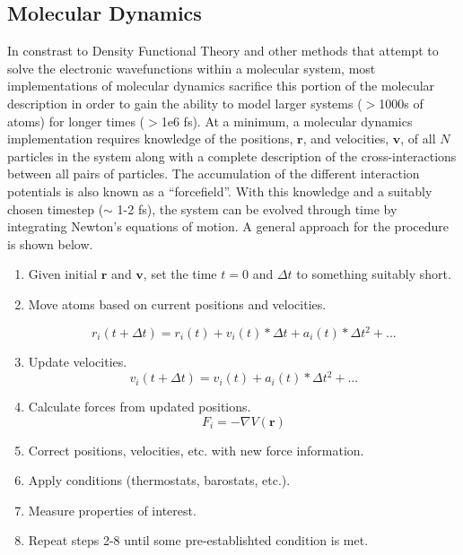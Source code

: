 \subsection{Molecular Dynamics}
In constrast to Density Functional Theory and other methods that attempt to
solve the electronic wavefunctions within a molecular system, most
implementations of molecular dynamics sacrifice this portion of the molecular
description in order to gain the ability to model larger systems ($>$1000s of
atoms) for longer times ($>$1e6 fs). At a minimum, a molecular dynamics
implementation requires knowledge of the positions, $\mathbf{r}$, and
velocities, $\mathbf{v}$, of all $N$ particles in the system along with a
complete description of the cross-interactions between all pairs of particles.
The accumulation of the different interaction potentials is also known as a
``forcefield''. With this knowledge and a suitably chosen timestep ($\sim$ 1-2
fs), the system can be evolved through time by integrating Newton's equations
of motion. A general approach for the procedure is shown below.

\begin{enumerate}
\item Given initial $\mathbf{r}$ and $\mathbf{v}$, set the time $t=0$ and
$\Delta t$ to something suitably short.

\item Move atoms based on current positions and velocities.

\begin{equation*}
r_i(t + \Delta t) = r_i(t) + v_i(t)*\Delta t + a_i(t)*\Delta t^2 + ...
\end{equation*}

\item Update velocities.
\begin{equation*}
v_i(t + \Delta t) = v_i(t) + a_i(t)*\Delta t^2 + ...
\end{equation*}

\item Calculate forces from updated positions.
\begin{equation*}
F_i = -\nabla V(\mathbf{r})
\end{equation*}

\item Correct positions, velocities, etc. with new force information.
\item Apply conditions (thermostats, barostats, etc.).
\item Measure properties of interest.
\item Repeat steps 2-8 until some pre-establishted condition is met.
\end{enumerate}

